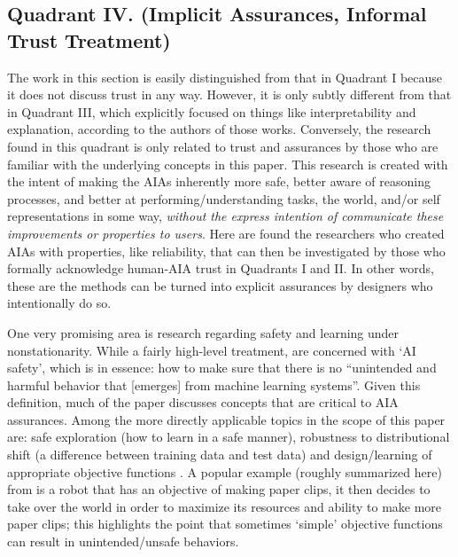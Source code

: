 \subsection{Quadrant IV. (Implicit Assurances, Informal Trust Treatment)}\label{sec:q4}
    The work in this section is easily distinguished from that in Quadrant I because it does not discuss trust in any way. However, it is only subtly different from that in Quadrant III, which explicitly focused on things like interpretability and explanation, according to the authors of those works. Conversely, the research found in this quadrant is only related to trust and assurances by those who are familiar with the underlying concepts in this paper. This research is created with the intent of making the AIAs inherently more safe, better aware of reasoning processes, and better at performing/understanding tasks, the world, and/or self representations in some way, \textit{without the express intention of communicate these improvements or properties to users}. 
Here are found the researchers who created AIAs with properties, like reliability, that can then be investigated by those who formally acknowledge human-AIA trust in Quadrants I and II. 
In other words, these are the methods can be turned into explicit assurances by designers who intentionally do so. 

One very promising area is research regarding safety and learning under nonstationarity. While a fairly high-level treatment, \citet{Amodei2016-xi} are concerned with `AI safety', which is in essence: how to make sure that there is no ``unintended and harmful behavior that [emerges] from machine learning systems''. Given this definition, much of the paper discusses concepts that are critical to AIA assurances. Among the more directly applicable topics in the scope of this paper are: safe exploration (how to learn in a safe manner), robustness to distributional shift (a difference between training data and test data) and design/learning of appropriate objective functions \cite{Sugiyama2013-ci,Quinonero-Candela2009-fj,Hadfield-Menell2016-ws,Da_Veiga2012-gh,Garcia2015-rs}. %
A popular example (roughly summarized here) from \citet{Bostrom2014-fz} is a robot that has an objective of making paper clips, it then decides to take over the world in order to maximize its resources and ability to make more paper clips; this highlights the point that sometimes `simple' objective functions can result in unintended/unsafe behaviors. 

